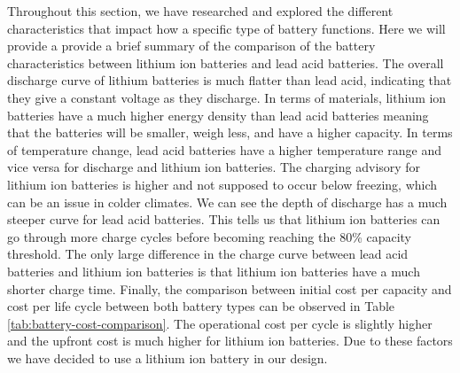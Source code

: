 Throughout this section, we have researched and explored the different characteristics that impact how a specific type of battery functions. Here we will provide a provide a brief summary of the comparison of the battery characteristics between lithium ion batteries and lead acid batteries. The overall discharge curve of lithium batteries is much flatter than lead acid, indicating that they give a constant voltage as they discharge. In terms of materials, lithium ion batteries have a much higher energy density than lead acid batteries meaning that the batteries will be smaller, weigh less, and have a higher capacity.  In terms of temperature change, lead acid batteries have a higher temperature range and vice versa for discharge and lithium ion batteries. The charging advisory for lithium ion batteries is higher and not supposed to occur below freezing, which can be an issue in colder climates. We can see the depth of discharge has a much steeper curve for lead acid batteries. This tells us that lithium ion batteries can go through more charge cycles before becoming reaching the 80\% capacity threshold. The only large difference in the charge curve between lead acid batteries and lithium ion batteries is that lithium ion batteries have a much shorter charge time. Finally, the comparison between initial cost per capacity and cost per life cycle between both battery types can be observed in Table \ref{tab:battery-cost-comparison}. The operational cost per cycle is slightly higher and the upfront cost is much higher for lithium ion batteries. Due to these factors we have decided to use a lithium ion battery in our design.

